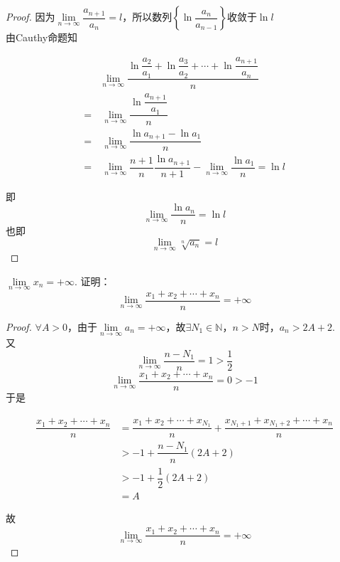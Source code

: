 \begin{proof}

    因为$\lim\limits_{n \to \infty}{\dfrac{a_{n + 1}}{a_n}} = l$，所以数列$\left\{ \ln{\dfrac{a_n}{a_{n - 1}}} \right\}$收敛于$\ln{l}$ \\
    由\textup{Cauthy}命题知
    
    \begin{align*}
        & \lim\limits_{n \to \infty}{\dfrac{\ln{\dfrac{a_2}{a_1}} + \ln{\dfrac{a_3}{a_2}} + \cdots + \ln{\dfrac{a_{n + 1}}{a_n}}}{n}} \\
        = & \ \lim\limits_{n \to \infty}{\dfrac{\ln{\dfrac{a_{n + 1}}{a_1}}}{n}} \\
        = & \ \lim\limits_{n \to \infty}{\dfrac{\ln{a_{n + 1} - \ln{a_1}}}{n}} \\
        = & \ \lim\limits_{n \to \infty}{\dfrac{n + 1}{n}\dfrac{\ln{a_{n + 1}}}{n + 1}} - \lim\limits_{n \to \infty}{\dfrac{\ln{a_1}}{n}} = \ln{l}
    \end{align*}

    即
    $$\lim\limits_{n \to \infty}{\dfrac{\ln{a_n}}{n}} = \ln{l}$$
    也即
    $$\lim\limits_{n \to \infty}{\sqrt[n]{a_n}} = l$$

\end{proof}

\begin{proposition}

    $\lim\limits_{n \to \infty}{x_n} = +\infty$. 证明：
    $$\lim\limits_{n \to \infty}{\dfrac{x_1 + x_2 + \cdots + x_n}{n}} = +\infty$$

\end{proposition}

\begin{proof} 

    $\forall A > 0$，由于$\lim\limits_{n \to \infty}{a_n} = +\infty$，故$\exists N_1 \in \mathbb{N}$，$n > N$时，$a_n > 2A + 2$. \\
    又
    $$\lim\limits_{n \to \infty}{\dfrac{n - N_1}{n}} = 1 > \dfrac{1}{2}$$
    $$\lim\limits_{n \to \infty}{\dfrac{x_1 + x_2 + \cdots + x_n}{n}} = 0 > -1$$
    于是

    \begin{align*}
        \dfrac{x_1 + x_2 + \cdots + x_n}{n} & = \dfrac{x_1 + x_2 + \cdots + x_{N_1}}{n} + \dfrac{x_{N_1 + 1} + x_{N_1 + 2} + \cdots + x_n}{n} \\
        & > -1 + \dfrac{n - N_1}{n}(2A + 2) \\
        & > -1 + \dfrac{1}{2}(2A + 2) \\
        & = A 
    \end{align*}

    故
    $$\lim\limits_{n \to \infty}{\dfrac{x_1 + x_2 + \cdots + x_n}{n}} = +\infty$$
    
\end{proof} 

